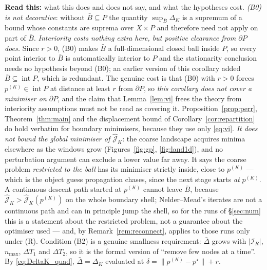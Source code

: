 \documentclass[11pt]{article}
\theoremstyle{remark}\newtheorem{remark}{Remark}
\newcommand{\pstar}{p^\star}
\newcommand{\norm}[1]{\lVert #1\rVert}
\newcommand{\hatJ}{\hat{\mathcal J}}
\newcommand{\readthis}[1]{\textbf{Read this:} #1}
\begin{document}
\readthis{what this does and does not say, and what the hypotheses cost.
\emph{(B0) is not decorative}: without $\bar B\subseteq P$ the quantity $\sup_{\bar B}\Delta_K$ is a supremum of a bound whose constants are suprema over $X\times P$ and therefore need not apply on part of $\bar B$.
\emph{Interiority costs nothing extra here, but positive clearance from $\partial P$ does.} Since $r>0$, (B0) makes $\bar B$ a full-dimensional closed ball inside $P$, so every point interior to $\bar B$ is automatically interior to $P$ and the stationarity conclusion needs no hypothesis beyond (B0); an earlier version of this corollary added $\bar B\subseteq\operatorname{int}P$, which is redundant. The genuine cost is that (B0) with $r>0$ forces $p^{(K)}\in\operatorname{int}P$ at distance at least $r$ from $\partial P$, so \emph{this corollary does not cover a minimiser on $\partial P$}, and the claim that Lemma~\ref{lem:vi} frees the theory from interiority assumptions must not be read as covering it. Proposition~\ref{prop:perr}, Theorem~\ref{thm:main} and the displacement bound of Corollary~\ref{cor:repartition} do hold verbatim for boundary minimisers, because they use only \eqref{eq:vi}.
\emph{It does not bound the global minimiser of $\hatJ_K$}: the coarse landscape acquires minima elsewhere as the windows grow (Figures~\ref{fig:gp}, \ref{fig:land1d}), and no perturbation argument can exclude a lower value far away. It says the coarse problem \emph{restricted to the ball} has its minimiser strictly inside, close to $p^{(K)}$ --- which is the object guess propagation chases, since the next stage starts \emph{at} $p^{(K)}$. A continuous descent path started at $p^{(K)}$ cannot leave $\bar B$, because $\hatJ_K>\hatJ_K(p^{(K)})$ on the whole boundary shell; Nelder--Mead's iterates are not a continuous path and can in principle jump the shell, so for the runs of \S\ref{sec:num} this is a statement about the restricted problem, not a guarantee about the optimiser used --- and, by Remark~\ref{rem:reconnect}, applies to those runs only under (R). Condition (B2) is a genuine smallness requirement: $\bar\Delta$ grows with $|\mathcal I_R|$, $n_{\max}$, $\Delta T_1$ and $\Delta T_2$, so it is the formal version of ``remove few nodes at a time''. By \eqref{eq:DeltaK_quad}, $\bar\Delta=\Delta_K$ evaluated at $\delta=\norm{p^{(K)}-\pstar}+r$.}
\end{document}
